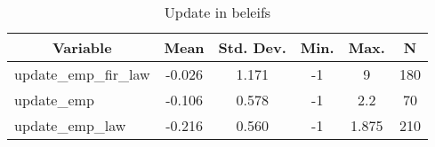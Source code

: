 
\begin{table}[htbp]\centering \caption{Update in beleifs \label{sumstat}}
\begin{tabular}{l c c c c c}\hline\hline
\multicolumn{1}{c}{\textbf{Variable}} & \textbf{Mean}
 & \textbf{Std. Dev.}& \textbf{Min.} &  \textbf{Max.} & \textbf{N}\\ \hline
update\_emp\_fir\_law & -0.026 & 1.171 & -1 & 9 & 180\\
update\_emp & -0.106 & 0.578 & -1 & 2.2 & 70\\
update\_emp\_law & -0.216 & 0.560 & -1 & 1.875 & 210\\
\hline\end{tabular}
\end{table}
